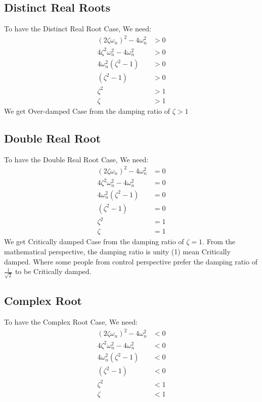 \subsection{Distinct Real Roots}
To have the Distinct Real Root Case, We need:
\[ 
\begin{split}
	(2\zeta\omega_n)^2 - 4\omega_n^2 &> 0 \\
	4\zeta^2\omega_n^2 - 4\omega_n^2 &> 0 \\
	4\omega_n^2 (\zeta^2 - 1) &> 0 \\
	(\zeta^2 - 1) &> 0 \\
	\zeta^2  &> 1 \\
	\zeta &> 1
\end{split}
\]
We get Over-damped Case from the damping ratio of $ \boxed{\zeta > 1} $


\subsection{Double Real Root}
To have the Double Real Root Case, We need:
\[ 
\begin{split}
	(2\zeta\omega_n)^2 - 4\omega_n^2 &= 0 \\
	4\zeta^2\omega_n^2 - 4\omega_n^2 &= 0 \\
	4\omega_n^2 (\zeta^2 - 1) &= 0 \\
	(\zeta^2 - 1) &= 0 \\
	\zeta^2  &= 1 \\
	\zeta &= 1
\end{split}
\]
We get Critically damped Case from the damping ratio of $ \boxed{\zeta = 1} $. From the mathematical perspective, the damping ratio is unity (1) mean Critically damped. Where some people from control perspective prefer the damping ratio of $ \frac{1}{\sqrt{2}} $ to be Critically damped.


\subsection{Complex Root}
To have the Complex Root Case, We need:
\[ 
\begin{split}
	(2\zeta\omega_n)^2 - 4\omega_n^2 &< 0 \\
	4\zeta^2\omega_n^2 - 4\omega_n^2 &< 0 \\
	4\omega_n^2 (\zeta^2 - 1) &< 0 \\
	(\zeta^2 - 1) &< 0 \\
	\zeta^2  &< 1 \\
	\zeta &< 1
\end{split}
\]

